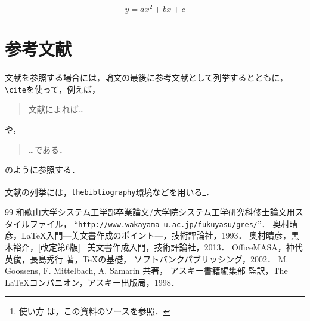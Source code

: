 \documentclass[11pt]{jreport}
\begin{document}
\begin{equation}
  y = ax^2 + bx + c \label{exp:sample}
\end{equation}

\chapter{参考文献}

文献を参照する場合には，論文の最後に参考文献として列挙するとともに，
\verb|\cite|を使って，例えば，
\begin{quote}
  文献\cite{latex}によれば…
\end{quote}
や，
\begin{quote}
  …である\cite{latex2e}．
\end{quote}
のように参照する．

文献の列挙には，{\tt thebibliography}環境などを用いる\footnote{使い方
は，この資料のソースを参照．}．




\begin{thebibliography}{99}
    和歌山大学システム工学部卒業論文/大学院システム工学研究科修士論文用スタイルファイル，
    ``{\tt http://www.wakayama-u.ac.jp/fukuyasu/gres/}''．
    奥村晴彦，\LaTeX 入門---美文書作成のポイント---，技術評論社，1993．
    奥村晴彦，黒木裕介，[改定第6版] \LaTeXe~美文書作成入門，技術評論社，2013．
    OfficeMASA，神代英俊，長島秀行 著，\TeX の基礎，
    ソフトバンクパブリッシング，2002．
    M. Goossens, F. Mittelbach, A. Samarin 共著，
    アスキー書籍編集部 監訳，The \LaTeX コンパニオン，アスキー出版局，1998．
\end{thebibliography}


% 
% 
% 

\end{document}
